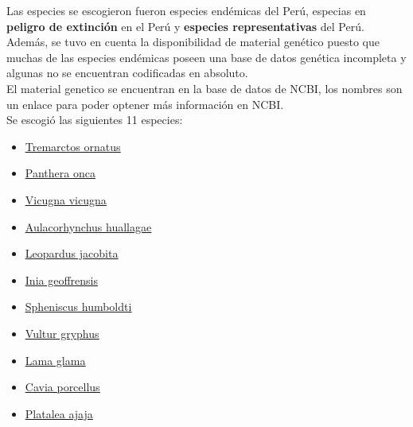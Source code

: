 \documentclass[a4paper]{article}
\begin{document}
Las especies se escogieron fueron especies endémicas del Perú, especias en \textbf{peligro de extinción} en el Perú y \textbf{especies representativas} del Perú. Además, se tuvo en cuenta la disponibilidad de material genético puesto que muchas de las especies endémicas poseen una base de datos genética incompleta y algunas no se encuentran codificadas en absoluto.\\

\noindent El material genetico se encuentran en la base de datos de NCBI, los nombres son un enlace para poder optener más información en NCBI.\\

\noindent Se escogió las siguientes 11 especies:
\begin{itemize}
    \item \href{https://www.ncbi.nlm.nih.gov/protein/ABM63279.1/}{\underline{Tremarctos ornatus}}
    
    \item 
    \href{https://www.ncbi.nlm.nih.gov/protein/AIY56286.1}{\underline{Panthera onca}}
    
    \item 
    \href{https://www.ncbi.nlm.nih.gov/protein/ACJ45788.1}{\underline{Vicugna vicugna}}
    
    \item 
    \href{https://www.ncbi.nlm.nih.gov/protein/329756060}{\underline{Aulacorhynchus huallagae}}
    
    \item 
    \href{https://www.ncbi.nlm.nih.gov/protein/YP_009178568.1}{\underline{Leopardus jacobita}}
    
    \item 
    \href{https://www.ncbi.nlm.nih.gov/protein/NP_944712.1}{\underline{Inia geoffrensis}}
    
    \item 
    \href{https://www.ncbi.nlm.nih.gov/protein/AON77377.1}{\underline{Spheniscus humboldti}}
    
    \item 
    \href{https://www.ncbi.nlm.nih.gov/protein/AEH42425.1}{\underline{Vultur gryphus}}
    
    \item 
    \href{https://www.ncbi.nlm.nih.gov/protein/BAH23368.1}{\underline{Lama glama}}
    
    \item 
    \href{https://www.ncbi.nlm.nih.gov/protein/AJE26518.1}{\underline{Cavia porcellus}}
    
    \item 
    \href{https://www.ncbi.nlm.nih.gov/protein/298371651}{\underline{Platalea ajaja}}
    
\end{itemize}
\end{document}
